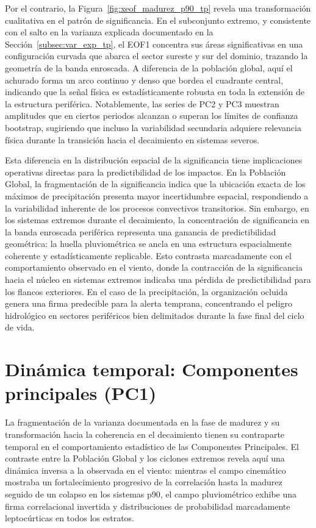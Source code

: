 Por el contrario, la Figura~\ref{fig:xeof_madurez_p90_tp} revela una transformación cualitativa en el patrón de significancia. En el subconjunto extremo, y consistente con el salto en la varianza explicada documentado en la Sección~\ref{subsec:var_exp_tp}, el EOF1 concentra sus áreas significativas en una configuración curvada que abarca el sector sureste y sur del dominio, trazando la geometría de la banda enroscada. A diferencia de la población global, aquí el achurado forma un arco continuo y denso que bordea el cuadrante central, indicando que la señal física es estadísticamente robusta en toda la extensión de la estructura periférica. Notablemente, las series de PC2 y PC3 muestran amplitudes que en ciertos periodos alcanzan o superan los límites de confianza bootstrap, sugiriendo que incluso la variabilidad secundaria adquiere relevancia física durante la transición hacia el decaimiento en sistemas severos.

Esta diferencia en la distribución espacial de la significancia tiene implicaciones operativas directas para la predictibilidad de los impactos. En la Población Global, la fragmentación de la significancia indica que la ubicación exacta de los máximos de precipitación presenta mayor incertidumbre espacial, respondiendo a la variabilidad inherente de los procesos convectivos transitorios. Sin embargo, en los sistemas extremos durante el decaimiento, la concentración de significancia en la banda enroscada periférica representa una ganancia de predictibilidad geométrica: la huella pluviométrica se ancla en una estructura espacialmente coherente y estadísticamente replicable. Esto contrasta marcadamente con el comportamiento observado en el viento, donde la contracción de la significancia hacia el núcleo en sistemas extremos indicaba una pérdida de predictibilidad para los flancos exteriores. En el caso de la precipitación, la organización ocluida genera una firma predecible para la alerta temprana, concentrando el peligro hidrológico en sectores periféricos bien delimitados durante la fase final del ciclo de vida.
\section{Dinámica temporal: Componentes principales (PC1)}\label{sec:dinamica_pc1_tp}

La fragmentación de la varianza documentada en la fase de madurez y su transformación hacia la coherencia en el decaimiento tienen su contraparte temporal en el comportamiento estadístico de las Componentes Principales. El contraste entre la Población Global y los ciclones extremos revela aquí una dinámica inversa a la observada en el viento: mientras el campo cinemático mostraba un fortalecimiento progresivo de la correlación hasta la madurez seguido de un colapso en los sistemas p90, el campo pluviométrico exhibe una firma correlacional invertida y distribuciones de probabilidad marcadamente leptocúrticas en todos los estratos.


